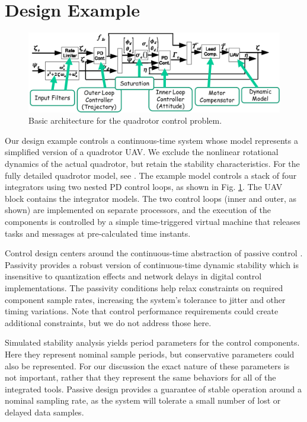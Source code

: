 \section{Design Example}

\begin{figure}[tb]
\centering
\includegraphics[width=\columnwidth]{figures/quadrotor_arch.png}
    \caption{Basic architecture for the quadrotor control problem.}
    \label{fig:quadrotor}
\end{figure}

Our design example controls a continuous-time system whose model represents a simplified 
version of a quadrotor UAV.  We exclude the nonlinear rotational dynamics of the actual 
quadrotor, but retain the stability characteristics.  For the fully detailed quadrotor model, 
see \cite{quad:passcontrol}.  The example model controls a stack of four integrators using 
two nested PD control loops, as shown in Fig. \ref{fig:quadrotor}.  The UAV block contains 
the integrator models. The two control loops (inner and outer, as shown) are implemented on 
separate processors, and the execution of the components is controlled by a simple time-triggered 
virtual machine that releases tasks and messages at pre-calculated time instants.

Control design centers around the continuous-time abstraction of passive control \cite{quad:passcontrol}.  
Passivity provides a robust version of continuous-time dynamic stability which is insensitive to 
quantization effects \cite{pass:fettweis86} and network delays \cite{ncs:chopra}\cite{ncs:wireless} 
in digital control implementations.  The passivity conditions help relax constraints on required 
component sample rates, increasing the system's tolerance to jitter and other timing variations.  
Note that control performance requirements could create additional constraints, but we do not 
address those here.  

Simulated stability analysis yields period parameters for the control components.  Here they 
represent nominal sample periods, but conservative parameters could also be represented.  For 
our discussion the exact nature of these parameters is not important, rather that they represent 
the same behaviors for all of the integrated tools.  Passive design provides a guarantee of stable 
operation around a nominal sampling rate, as the system will tolerate a small number of lost or 
delayed data samples.

